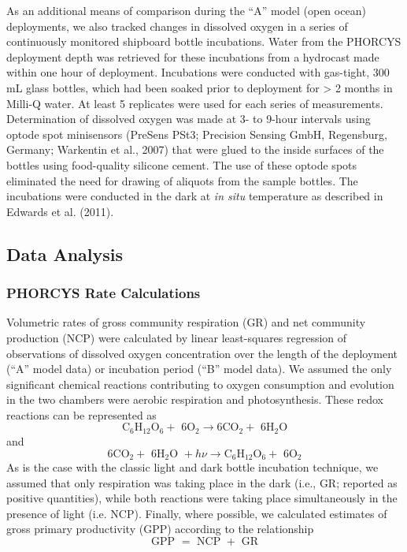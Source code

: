 As an additional means of comparison during the ``A'' model (open ocean) deployments, we also tracked changes in dissolved oxygen in a series of continuously monitored shipboard bottle incubations. Water from the PHORCYS deployment depth was retrieved for these incubations from a hydrocast made within one hour of deployment. Incubations were conducted with gas-tight, 300 mL glass bottles, which had been soaked prior to deployment for \textgreater{} 2 months in Milli-Q water. At least 5 replicates were used for each series of measurements. Determination of dissolved oxygen was made at 3- to 9-hour intervals using optode spot minisensors (PreSens PSt3; Precision Sensing GmbH, Regensburg, Germany; Warkentin et al., 2007) that were glued to the inside surfaces of the bottles using food-quality silicone cement. The use of these optode spots eliminated the need for drawing of aliquots from the sample bottles. The incubations were conducted in the dark at \emph{in situ} temperature as described in Edwards et al. (2011).
\subsection{Data Analysis}
\subsubsection{PHORCYS Rate Calculations}
Volumetric rates of gross community respiration (GR) and net community production (NCP) were calculated by linear least-squares regression of observations of dissolved oxygen concentration over the length of the deployment (``A'' model data) or incubation period (``B'' model data). We assumed the only significant chemical reactions contributing to oxygen consumption and evolution in the two chambers were aerobic respiration and photosynthesis. These redox reactions can be represented as
\begin{equation} \label{eq:aan1}
{{\text{C}}_{\text{6}}}{{\text{H}}_{{\text{12}}}}{{\text{O}}_{\text{6}}} + {\text{ 6}}{{\text{O}}_{\text{2}}} \to {\text{6C}}{{\text{O}}_{\text{2}}} + {\text{ 6}}{{\text{H}}_{\text{2}}}{\text{O}}
\end{equation}
and
\begin{equation} \label{eq:aan2}
{\text{6C}}{{\text{O}}_{\text{2}}} + {\text{ 6}}{{\text{H}}_{\text{2}}}{\text{O }} + h\nu  \to {{\text{C}}_{\text{6}}}{{\text{H}}_{{\text{12}}}}{{\text{O}}_{\text{6}}} + {\text{ 6}}{{\text{O}}_{\text{2}}}
\end{equation}
As is the case with the classic light and dark bottle incubation technique, we assumed that only respiration was taking place in the dark (i.e., GR; reported as positive quantities), while both reactions were taking place simultaneously in the presence of light (i.e. NCP). Finally, where possible, we calculated estimates of gross primary productivity (GPP) according to the relationship
\begin{equation} \label{eq:aan3}
{\text{GPP }} = {\text{ NCP }} + {\text{ GR}}
\end{equation}
